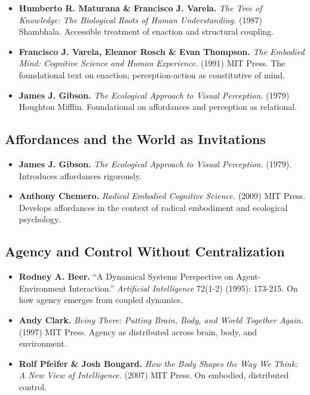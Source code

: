 \documentclass[
  openright]{book}
\begin{document}
\begin{itemize}
\item
  \textbf{Humberto R. Maturana \& Francisco J. Varela.} \emph{The Tree
  of Knowledge: The Biological Roots of Human Understanding.} (1987)
  Shambhala. Accessible treatment of enaction and structural coupling.
\item
  \textbf{Francisco J. Varela, Eleanor Rosch \& Evan Thompson.}
  \emph{The Embodied Mind: Cognitive Science and Human Experience.}
  (1991) MIT Press. The foundational text on enaction; perception-action
  as constitutive of mind.
\item
  \textbf{James J. Gibson.} \emph{The Ecological Approach to Visual
  Perception.} (1979) Houghton Mifflin. Foundational on affordances and
  perception as relational.
\end{itemize}

\subsection{Affordances and the World as
Invitations}\label{affordances-and-the-world-as-invitations}

\begin{itemize}
\item
  \textbf{James J. Gibson.} \emph{The Ecological Approach to Visual
  Perception.} (1979). Introduces affordances rigorously.
\item
  \textbf{Anthony Chemero.} \emph{Radical Embodied Cognitive Science.}
  (2009) MIT Press. Develops affordances in the context of radical
  embodiment and ecological psychology.
\end{itemize}

\subsection{Agency and Control Without
Centralization}\label{agency-and-control-without-centralization}

\begin{itemize}
\item
  \textbf{Rodney A. Beer.} ``A Dynamical Systems Perspective on
  Agent-Environment Interaction.'' \emph{Artificial Intelligence}
  72(1-2) (1995): 173-215. On how agency emerges from coupled dynamics.
\item
  \textbf{Andy Clark.} \emph{Being There: Putting Brain, Body, and World
  Together Again.} (1997) MIT Press. Agency as distributed across brain,
  body, and environment.
\item
  \textbf{Rolf Pfeifer \& Josh Bongard.} \emph{How the Body Shapes the
  Way We Think: A New View of Intelligence.} (2007) MIT Press. On
  embodied, distributed control.
\end{itemize}
\end{document}
